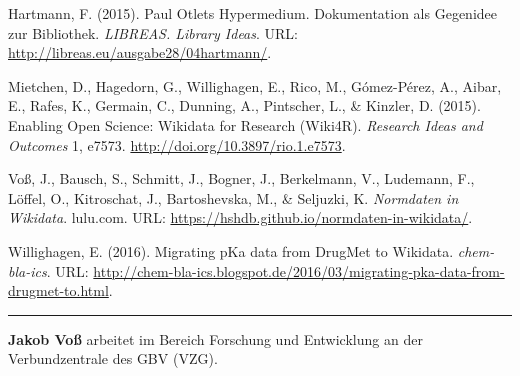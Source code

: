 \documentclass[a4paper,
fontsize=11pt,
oneside,
numbers=noperiodatend,
parskip=half-,
bibliography=totoc,
final
]{scrartcl}
\begin{document}
Hartmann, F. (2015). Paul Otlets Hypermedium. Dokumentation als
Gegenidee zur Bibliothek. \emph{LIBREAS. Library Ideas}. URL:
\url{http://libreas.eu/ausgabe28/04hartmann/}.

Mietchen, D., Hagedorn, G., Willighagen, E., Rico, M., Gómez-Pérez, A.,
Aibar, E., Rafes, K., Germain, C., Dunning, A., Pintscher, L., \&
Kinzler, D. (2015). Enabling Open Science: Wikidata for Research
(Wiki4R). \emph{Research Ideas and Outcomes} 1, e7573.
\url{http://doi.org/10.3897/rio.1.e7573}.

Voß, J., Bausch, S., Schmitt, J., Bogner, J., Berkelmann, V., Ludemann,
F., Löffel, O., Kitroschat, J., Bartoshevska, M., \& Seljuzki, K.
\emph{Normdaten in Wikidata}. lulu.com. URL:
\url{https://hshdb.github.io/normdaten-in-wikidata/}.

Willighagen, E. (2016). Migrating pKa data from DrugMet to Wikidata.
\emph{chem-bla-ics}. URL:
\url{http://chem-bla-ics.blogspot.de/2016/03/migrating-pka-data-from-drugmet-to.html}.

\begin{center}\rule{0.5\linewidth}{\linethickness}\end{center}

\textbf{Jakob Voß} arbeitet im Bereich Forschung und Entwicklung an der
Verbundzentrale des GBV (VZG).
\end{document}
